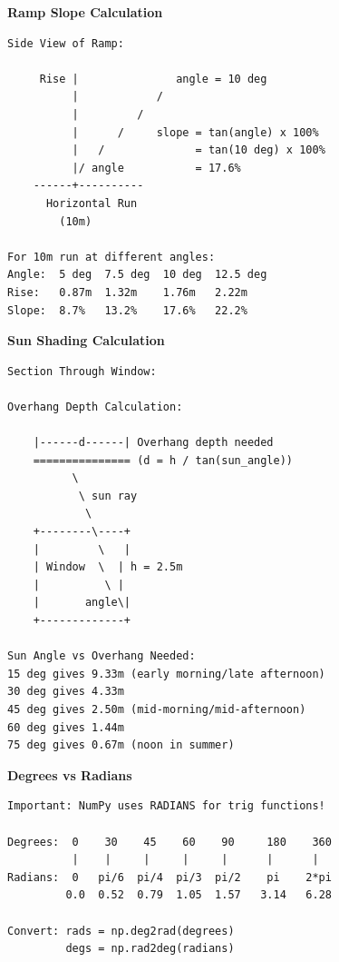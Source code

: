 \begin{tcolorbox}[
    title=Trigonometry in Architecture (Visual),
    colframe=teal,
    colback = white,
    arc=2mm
]
\textbf{Ramp Slope Calculation}
\begin{lstlisting}[basicstyle=\ttfamily\footnotesize,breaklines=true,columns=fullflexible,keepspaces=true,xleftmargin=0pt]
Side View of Ramp:
                          
     Rise |               angle = 10 deg
          |            /
          |         /
          |      /     slope = tan(angle) x 100%
          |   /              = tan(10 deg) x 100%
          |/ angle           = 17.6%
    ------+----------
      Horizontal Run
        (10m)

For 10m run at different angles:
Angle:  5 deg  7.5 deg  10 deg  12.5 deg
Rise:   0.87m  1.32m    1.76m   2.22m
Slope:  8.7%   13.2%    17.6%   22.2%

\end{lstlisting}

\textbf{Sun Shading Calculation}
\begin{lstlisting}[basicstyle=\ttfamily\footnotesize,breaklines=true,columns=fullflexible,keepspaces=true,xleftmargin=0pt]
Section Through Window:

Overhang Depth Calculation:
                    
    |------d------| Overhang depth needed
    =============== (d = h / tan(sun_angle))
          \
           \ sun ray
            \
    +--------\----+
    |         \   |
    | Window  \  | h = 2.5m
    |          \ |
    |       angle\|
    +-------------+
    
Sun Angle vs Overhang Needed:
15 deg gives 9.33m (early morning/late afternoon)
30 deg gives 4.33m 
45 deg gives 2.50m (mid-morning/mid-afternoon)
60 deg gives 1.44m 
75 deg gives 0.67m (noon in summer)

\end{lstlisting}

\textbf{Degrees vs Radians}
\begin{lstlisting}[basicstyle=\ttfamily\footnotesize,breaklines=true,columns=fullflexible,keepspaces=true,xleftmargin=0pt]
Important: NumPy uses RADIANS for trig functions!

Degrees:  0    30    45    60    90     180    360
          |    |     |     |     |      |      |
Radians:  0   pi/6  pi/4  pi/3  pi/2    pi    2*pi
         0.0  0.52  0.79  1.05  1.57   3.14   6.28

Convert: rads = np.deg2rad(degrees)
         degs = np.rad2deg(radians)

\end{lstlisting}
\end{tcolorbox}

